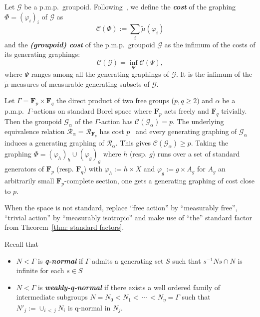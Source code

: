 \documentclass[AHL,Unicode,longabstracts,published]{cedram}
\newcommand{\defin}[1]{\textbf{\emph{#1}}}
\newcommand{\FF}{\mathbf{F}}
\newcommand{\RR}{\mathcal{R}}
\newcommand{\cost}{\mathcal{C}}
\newcommand{\cg}{\mathcal{G}}
\newcommand{\ph}{\varphi}
\newcommand{\pmp}{p.m.p.\ }
\begin{document}
Let $\cg$ be a \pmp groupoid. Following~\cite{Lev95}, we define the
\defin{cost} of the graphing $\Phi=(\ph_i)_i$ of $\cg$ as
\begin{equation}
\cost(\Phi):=\sum_i \widetilde \mu(\ph_i)
\end{equation}
and the
\defin{(groupoid) cost} of the \pmp groupoid $\cg$ as the infimum of the costs of its generating graphings:
\begin{equation}
\cost(\cg)=\inf_\Psi\cost(\Psi),
\end{equation}
where $\Psi$ ranges among all the generating graphings of $\cg$. It is the infimum of the $\widetilde{\mu}$-measures of measurable generating subsets of $\cg$.


\begin{exam}
Let $\Gamma=\FF_p\times \FF_q$ the direct product of two free groups ($p, q\geq 2$) and $\alpha $ be a \pmp $\Gamma$-actions on standard Borel space where $\FF_p$ acts freely and $\FF_q$ trivially. Then the groupoid $\cg_{\alpha}$ of the $\Gamma$-action has $\cost(\cg_{\alpha})=p$. The underlying equivalence relation $\RR_{\alpha}=\RR_{\FF_p}$ has cost $p$~\cite{Gab-cost} and every generating graphing of $\cg_{\alpha}$ induces a generating graphing of $\RR_{\alpha}$. This gives $\cost(\cg_{\alpha})\geq p$. Taking the graphing $\Phi=(\ph_h)_{h}\cup (\ph_g)_g$ where $h$ (resp. $g$) runs over a set of standard generators of $\FF_p$ (resp. $\FF_q$) with $\ph_h:=h\times X$ and $\ph_g:=g\times A_g$ for $A_g$ an arbitrarily small $\FF_p$-complete section, one gets a generating graphing of cost close to $p$.

When the space is not standard, replace ``free action'' by ``measurably free'', ``trivial action'' by ``measurably isotropic'' and make use of ``the'' standard factor from Theorem~\ref{thm: standard factors}.
\end{exam}


Recall that
\begin{itemize}
\item[--] $N<\Gamma$ is \defin{q-normal} if $\Gamma$ admits a generating set $S$ such that $s ^{-1}N s\cap N$ is infinite for each $s\in S$
\item[--] $N<\Gamma$ is \defin{weakly-q-normal} if there exists a well ordered family of intermediate subgroups $N=N_0<N_1<\,\cdots\,<N_{\eta}=\Gamma$ such that $N'_j:=\cup_{i\,<\,j} N_i$ is q-normal in $N_j$.
\end{itemize}
\end{document}
